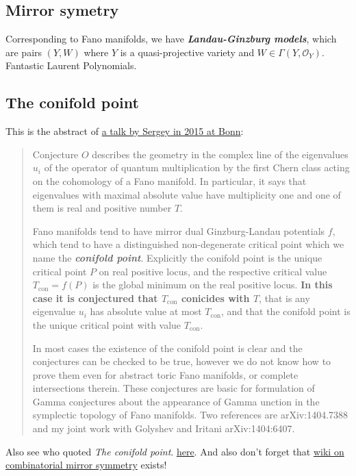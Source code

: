 	\subsection*{Mirror symetry}
	Corresponding to Fano manifolds, we have \textbf{\textit{Landau-Ginzburg models}}, which are pairs $(Y,W)$ where $Y$ is a quasi-projective variety and $W\in\Gamma(Y,\mathcal{O}_Y)$. Fantastic Laurent Polynomials.
	
	\subsection{The conifold point}
	This is the abstract of \href{http://www.mpim-bonn.mpg.de/node/5969}{a talk by Sergey in 2015 at Bonn}:
	\begin{quotation}
		Conjecture $O$ describes the geometry in the complex line of the eigenvalues $u_i$ of the operator of quantum multiplication by the first Chern class acting on the cohomology of a Fano manifold. In particular, it says that eigenvalues with maximal absolute value have multiplicity one and one of them is real and positive number $T$.
		
		Fano manifolds tend to have mirror dual Ginzburg-Landau potentials $f$, which
		tend to have a distinguished non-degenerate critical point which we name the
		\textbf{\textit{conifold point}}. Explicitly the conifold point is the unique critical point $P$ on real positive locus, and the respective critical value $T_{\operatorname{ co n}} = f(P)$ is the global minimum on the real positive locus. \textbf{In this case it is conjectured that $T_{\operatorname{ co n}}$ conicides with $T$}, that is any eigenvalue $u_i$ has absolute value at most $T_{\operatorname{ co n}}$, and that the conifold point is the unique critical point with value $T_{\operatorname{ co n}}$.
		
		In most cases the existence of the conifold point is clear and the conjectures
		can be checked to be true, however we do not know how to prove them even
		for abstract toric Fano manifolds, or complete intersections therein. These conjectures
		are basic for formulation of Gamma conjectures about the appearance of Gamma
		unction in the symplectic topology of Fano manifolds. Two references are arXiv:1404.7388
		and my joint work with Golyshev and Iritani arXiv:1404:6407.
	\end{quotation}
	Also see who quoted \textit{The conifold point}.  \href{https://scholar.google.com/scholar?start=20&hl=es&as_sdt=2005&sciodt=0,5&cites=11808564544162580683&scipsc=}{here}. And also don't forget that \href{https://en.wikipedia.org/wiki/Combinatorial_mirror_symmetry}{wiki on combinatorial mirror symmetry} exists!
	
